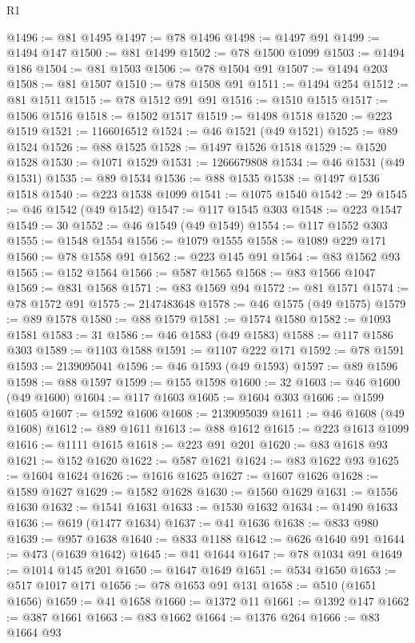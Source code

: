 \begin{lexlean}{R1}
\begin{coremodule}
@1496 := @81 @1495
@1497 := @78 @1496
@1498 := @1497 @91
@1499 := @1494 @147
@1500 := @81 @1499
@1502 := @78 @1500 @1099
@1503 := @1494 @186
@1504 := @81 @1503
@1506 := @78 @1504 @91
@1507 := @1494 @203
@1508 := @81 @1507
@1510 := @78 @1508 @91
@1511 := @1494 @254
@1512 := @81 @1511
@1515 := @78 @1512 @91 @91
@1516 := @1510 @1515
@1517 := @1506 @1516
@1518 := @1502 @1517
@1519 := @1498 @1518
@1520 := @223 @1519
@1521 := 1166016512
@1524 := @46 @1521 (@49 @1521)
@1525 := @89 @1524
@1526 := @88 @1525
@1528 := @1497 @1526 @1518
@1529 := @1520 @1528
@1530 := @1071 @1529
@1531 := 1266679808
@1534 := @46 @1531 (@49 @1531)
@1535 := @89 @1534
@1536 := @88 @1535
@1538 := @1497 @1536 @1518
@1540 := @223 @1538 @1099
@1541 := @1075 @1540
@1542 := 29
@1545 := @46 @1542 (@49 @1542)
@1547 := @117 @1545 @303
@1548 := @223 @1547
@1549 := 30
@1552 := @46 @1549 (@49 @1549)
@1554 := @117 @1552 @303
@1555 := @1548 @1554
@1556 := @1079 @1555
@1558 := @1089 @229 @171
@1560 := @78 @1558 @91
@1562 := @223 @145 @91
@1564 := @83 @1562 @93
@1565 := @152 @1564
@1566 := @587 @1565
@1568 := @83 @1566 @1047
@1569 := @831 @1568
@1571 := @83 @1569 @94
@1572 := @81 @1571
@1574 := @78 @1572 @91
@1575 := 2147483648
@1578 := @46 @1575 (@49 @1575)
@1579 := @89 @1578
@1580 := @88 @1579
@1581 := @1574 @1580
@1582 := @1093 @1581
@1583 := 31
@1586 := @46 @1583 (@49 @1583)
@1588 := @117 @1586 @303
@1589 := @1103 @1588
@1591 := @1107 @222 @171
@1592 := @78 @1591
@1593 := 2139095041
@1596 := @46 @1593 (@49 @1593)
@1597 := @89 @1596
@1598 := @88 @1597
@1599 := @155 @1598
@1600 := 32
@1603 := @46 @1600 (@49 @1600)
@1604 := @117 @1603
@1605 := @1604 @303
@1606 := @1599 @1605
@1607 := @1592 @1606
@1608 := 2139095039
@1611 := @46 @1608 (@49 @1608)
@1612 := @89 @1611
@1613 := @88 @1612
@1615 := @223 @1613 @1099
@1616 := @1111 @1615
@1618 := @223 @91 @201
@1620 := @83 @1618 @93
@1621 := @152 @1620
@1622 := @587 @1621
@1624 := @83 @1622 @93
@1625 := @1604 @1624
@1626 := @1616 @1625
@1627 := @1607 @1626
@1628 := @1589 @1627
@1629 := @1582 @1628
@1630 := @1560 @1629
@1631 := @1556 @1630
@1632 := @1541 @1631
@1633 := @1530 @1632
@1634 := @1490 @1633
@1636 := @619 (@1477 @1634)
@1637 := @41 @1636
@1638 := @833 @980
@1639 := @957 @1638
@1640 := @833 @1188
@1642 := @626 @1640 @91
@1644 := @473 (@1639 @1642)
@1645 := @41 @1644
@1647 := @78 @1034 @91
@1649 := @1014 @145 @201
@1650 := @1647 @1649
@1651 := @534 @1650
@1653 := @517 @1017 @171
@1656 := @78 @1653 @91 @131
@1658 := @510 (@1651 @1656)
@1659 := @41 @1658
@1660 := @1372 @11
@1661 := @1392 @147
@1662 := @387 @1661
@1663 := @83 @1662
@1664 := @1376 @264
@1666 := @83 @1664 @93

\end{coremodule}
\end{lexlean}
